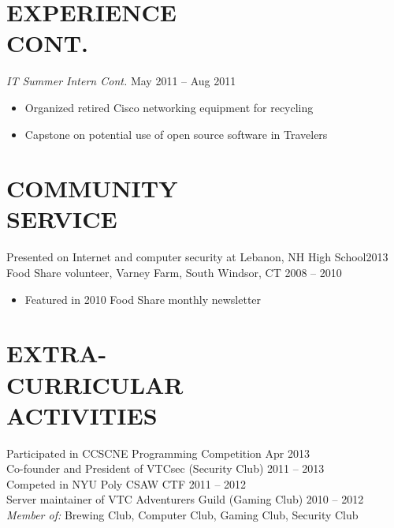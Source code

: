 \documentclass[margin]{res}
\begin{document}
\begin{resume}
\section{EXPERIENCE \\ CONT.}
		    {\sl IT Summer Intern Cont.} \hfill May 2011 -- Aug 2011 
                    \begin{itemize}
                         \item Organized retired Cisco networking equipment for
                               recycling
                         \item Capstone on potential use of open source software 
                               in Travelers
                     \end{itemize} 
 
\section{COMMUNITY \\ SERVICE} 
                Presented on Internet and computer security at Lebanon, 
                NH High School\hfill 2013\\
                Food Share volunteer, Varney Farm, South Windsor, 
                CT \hfill 2008 -- 2010
                \begin{itemize}
                    \item Featured in 2010 Food Share monthly newsletter
                \end{itemize}
     

\section{EXTRA- \\ CURRICULAR \\ ACTIVITIES} 
                Participated in CCSCNE Programming Competition
                	\hfill Apr 2013\\
                Co-founder and President of VTCsec (Security Club) 
                    \hfill 2011 -- 2013\\
                Competed in NYU Poly CSAW CTF \hfill 2011 -- 2012\\
                Server maintainer of VTC Adventurers Guild (Gaming Club)
                    \hfill 2010 -- 2012\\
                {\sl Member of:} Brewing Club, Computer Club, Gaming Club, 
                                 Security Club
 

\end{resume}
\end{document}
